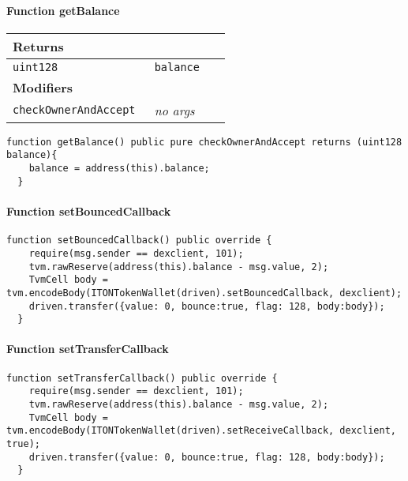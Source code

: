 \paragraph{Function getBalance}


\ifsoltables
\noindent\begin{tabular}{|l|l|p{5cm}|}\hline
\multicolumn{3}{|l|}{\bf Returns}\\\hline
\tt uint128 & \tt balance &\\\hline
\multicolumn{3}{|l|}{\bf Modifiers}\\\hline
\tt checkOwnerAndAccept & {\em no args} &\\\hline
\end{tabular}
\fi

\vspace{2cm}

\begin{lstlisting}[firstnumber=124]
  function getBalance() public pure checkOwnerAndAccept returns (uint128 balance){
    balance = address(this).balance;
  }
\end{lstlisting}

\paragraph{Function setBouncedCallback}

\vspace{2cm}

\begin{lstlisting}[firstnumber=95]
  function setBouncedCallback() public override {
    require(msg.sender == dexclient, 101);
    tvm.rawReserve(address(this).balance - msg.value, 2);
    TvmCell body = tvm.encodeBody(ITONTokenWallet(driven).setBouncedCallback, dexclient);
    driven.transfer({value: 0, bounce:true, flag: 128, body:body});
  }
\end{lstlisting}

\paragraph{Function setTransferCallback}

\vspace{2cm}

\begin{lstlisting}[firstnumber=87]
  function setTransferCallback() public override {
    require(msg.sender == dexclient, 101);
    tvm.rawReserve(address(this).balance - msg.value, 2);
    TvmCell body = tvm.encodeBody(ITONTokenWallet(driven).setReceiveCallback, dexclient, true);
    driven.transfer({value: 0, bounce:true, flag: 128, body:body});
  }
\end{lstlisting}

